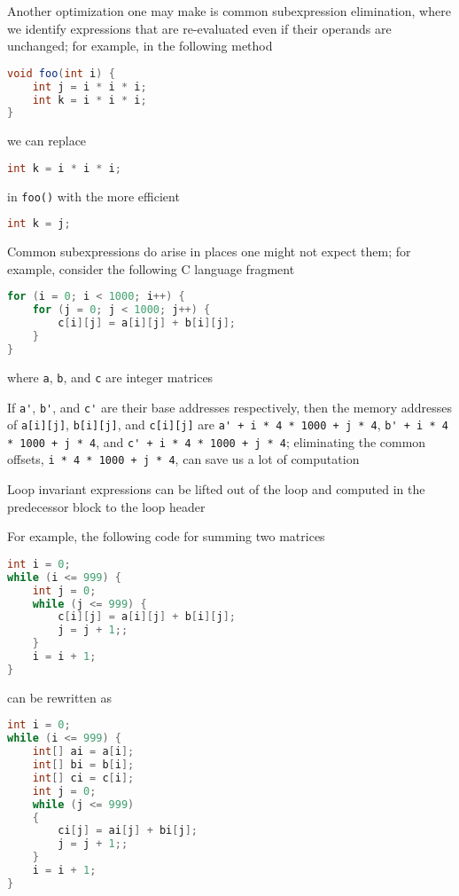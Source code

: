 \documentclass[8pt,a4paper,compress]{beamer}
\begin{document}
\begin{frame}[fragile]
\pause

Another optimization one may make is common subexpression elimination, where we identify expressions that are re-evaluated even if their operands are unchanged; for example, in the following method

\begin{lstlisting}[language=Java]
void foo(int i) {
    int j = i * i * i;
    int k = i * i * i;
}
\end{lstlisting}

we can replace

\begin{lstlisting}[language=Java]
int k = i * i * i;
\end{lstlisting}

in \lstinline{foo()} with the more efficient

\begin{lstlisting}[language=Java]
int k = j;
\end{lstlisting}

\pause
\bigskip

Common subexpressions do arise in places one might not expect them; for example, consider the following C language fragment
\begin{lstlisting}[language=C]
for (i = 0; i < 1000; i++) {
    for (j = 0; j < 1000; j++) {
        c[i][j] = a[i][j] + b[i][j];
    }
}
\end{lstlisting}
where \lstinline{a}, \lstinline{b}, and \lstinline{c} are integer matrices 

\pause
\bigskip

If \lstinline{a'}, \lstinline{b'}, and \lstinline{c'} are their base addresses respectively, then the memory addresses of \lstinline{a[i][j]}, \lstinline{b[i][j]}, and \lstinline{c[i][j]} are \lstinline{a' + i * 4 * 1000 + j * 4}, \lstinline{b' + i * 4 * 1000 + j * 4}, and \lstinline{c' + i * 4 * 1000 + j * 4}; eliminating the common offsets, \lstinline{i * 4 * 1000 + j * 4}, can save us a lot of computation
\end{frame}

\begin{frame}[fragile]
\pause

Loop invariant expressions can be lifted out of the loop and computed in the predecessor block to the loop header

\pause
\bigskip

For example, the following \jmm code for summing two matrices
\begin{lstlisting}[language=Java]
int i = 0;
while (i <= 999) {
    int j = 0;
    while (j <= 999) {
        c[i][j] = a[i][j] + b[i][j];
        j = j + 1;;
    }
    i = i + 1;
}
\end{lstlisting}

can be rewritten as 

\begin{lstlisting}[language=Java]
int i = 0;
while (i <= 999) {
    int[] ai = a[i];
    int[] bi = b[i];
    int[] ci = c[i];
    int j = 0;
    while (j <= 999)
    {
        ci[j] = ai[j] + bi[j];
        j = j + 1;;
    }
    i = i + 1;
}
\end{lstlisting}
\end{frame}
\end{document}
